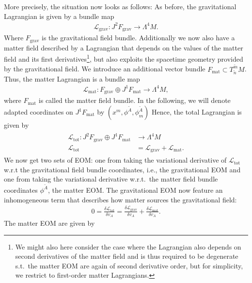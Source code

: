 More precisely, the situation now looks as follows:
As before, the gravitational Lagrangian is given by a bundle map
\begin{align}
    \mathcal{L}_{\text{grav}} : J^2F_{\text{grav}} \longrightarrow \Lambda^4M.
\end{align}
Where $F_{\text{grav}}$ is the gravitational field bundle. Additionally we now also have a matter field described by a Lagrangian that depends on the values of the matter field and its first derivatives\footnote{We might also here consider the case where the Lagrangian also depends on second derivatives of the matter field and is thus required to be degenerate s.t.\ the matter EOM are again of second derivative order, but for simplicity, we restrict to first-order matter Lagrangians.}, but also exploits the spacetime geometry provided by the gravitational field. 
We introduce an additional vector bundle $F_{\text{mat}} \subset T^{\tilde{m}}_{\tilde{n}}M$.
Thus, the matter Lagrangian is a bundle map
\begin{align}
    \mathcal{L}_{\text{mat}} : F_{\text{grav}} \oplus J^1F_{\text{mat}} \longrightarrow \Lambda^4M,
\end{align}
where $F_{\text{mat}}$ is called the matter field bundle. In the following, we will denote adapted coordinates on $J^1F_{\text{mat}}$ by $(x^m,\phi^{\tilde{A}},\phi^{\tilde{A}}_m)$ Hence, the total Lagrangian is given by
\begin{align}
\begin{aligned}
    \mathcal{L}_{\text{tot}} : J^2F_{\text{grav}} \oplus J^1F_{\text{mat}} &\longrightarrow \Lambda^4M \\
    \mathcal{L}_{\text{tot}} &= \mathcal{L}_{\text{grav}} + \mathcal{L}_{\text{mat}}.
\end{aligned}
\end{align}
We now get two sets of EOM: one from taking the variational derivative of $\mathcal{L}_{\text{tot}}$ w.r.t the gravitational field bundle coordinates, i.e., the gravitational EOM and one from taking the variational derivative w.r.t.\ the matter field bundle coordinates $\phi^{\tilde{A}}$, the matter EOM.
The gravitational EOM now feature an inhomogeneous term that describes how matter sources the gravitational field:
\begin{align}
    0 = \frac{\delta \mathcal{L}_{\text{tot}}}{\delta v_A} = \frac{\delta \mathcal{L}_{\text{grav}}}{\delta v_A} + \frac{\delta \mathcal{L}_{\text{mat}}}{\delta v_A}.
\end{align}
The matter EOM are given by 
